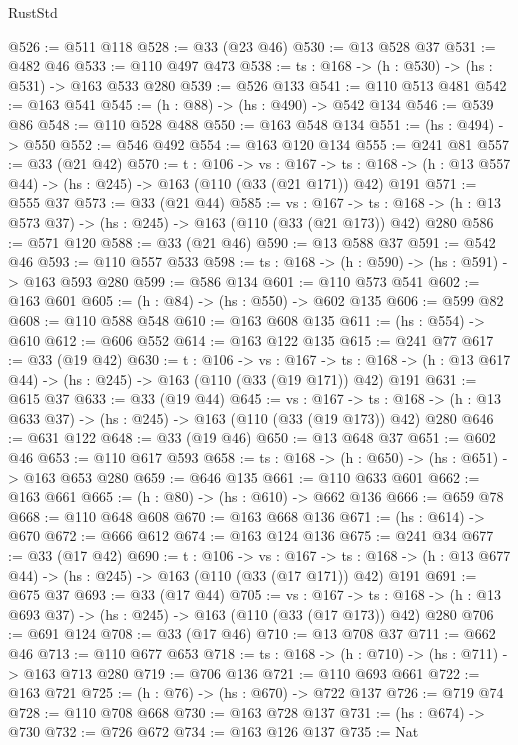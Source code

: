\begin{lexlean}{RustStd}
\begin{coremodule}
{\begin{coremodule}
{{{@526 := @511 @118
@528 := @33 (@23 @46)
@530 := @13 @528 @37
@531 := @482 @46
@533 := @110 @497 @473
@538 := {ts : @168} -> (h : @530) -> (hs : @531) -> @163 @533 @280
@539 := @526 @133
@541 := @110 @513 @481
@542 := @163 @541
@545 := (h : @88) -> (hs : @490) -> @542 @134
@546 := @539 @86
@548 := @110 @528 @488
@550 := @163 @548 @134
@551 := (hs : @494) -> @550
@552 := @546 @492
@554 := @163 @120 @134
@555 := @241 @81
@557 := @33 (@21 @42)
@570 := {t : @106} ->
  {vs : @167} ->
  {ts : @168} -> (h : @13 @557 @44) -> (hs : @245) -> @163 (@110 (@33 (@21 @171)) @42) @191
@571 := @555 @37
@573 := @33 (@21 @44)
@585 := {vs : @167} ->
  {ts : @168} -> (h : @13 @573 @37) -> (hs : @245) -> @163 (@110 (@33 (@21 @173)) @42) @280
@586 := @571 @120
@588 := @33 (@21 @46)
@590 := @13 @588 @37
@591 := @542 @46
@593 := @110 @557 @533
@598 := {ts : @168} -> (h : @590) -> (hs : @591) -> @163 @593 @280
@599 := @586 @134
@601 := @110 @573 @541
@602 := @163 @601
@605 := (h : @84) -> (hs : @550) -> @602 @135
@606 := @599 @82
@608 := @110 @588 @548
@610 := @163 @608 @135
@611 := (hs : @554) -> @610
@612 := @606 @552
@614 := @163 @122 @135
@615 := @241 @77
@617 := @33 (@19 @42)
@630 := {t : @106} ->
  {vs : @167} ->
  {ts : @168} -> (h : @13 @617 @44) -> (hs : @245) -> @163 (@110 (@33 (@19 @171)) @42) @191
@631 := @615 @37
@633 := @33 (@19 @44)
@645 := {vs : @167} ->
  {ts : @168} -> (h : @13 @633 @37) -> (hs : @245) -> @163 (@110 (@33 (@19 @173)) @42) @280
@646 := @631 @122
@648 := @33 (@19 @46)
@650 := @13 @648 @37
@651 := @602 @46
@653 := @110 @617 @593
@658 := {ts : @168} -> (h : @650) -> (hs : @651) -> @163 @653 @280
@659 := @646 @135
@661 := @110 @633 @601
@662 := @163 @661
@665 := (h : @80) -> (hs : @610) -> @662 @136
@666 := @659 @78
@668 := @110 @648 @608
@670 := @163 @668 @136
@671 := (hs : @614) -> @670
@672 := @666 @612
@674 := @163 @124 @136
@675 := @241 @34
@677 := @33 (@17 @42)
@690 := {t : @106} ->
  {vs : @167} ->
  {ts : @168} -> (h : @13 @677 @44) -> (hs : @245) -> @163 (@110 (@33 (@17 @171)) @42) @191
@691 := @675 @37
@693 := @33 (@17 @44)
@705 := {vs : @167} ->
  {ts : @168} -> (h : @13 @693 @37) -> (hs : @245) -> @163 (@110 (@33 (@17 @173)) @42) @280
@706 := @691 @124
@708 := @33 (@17 @46)
@710 := @13 @708 @37
@711 := @662 @46
@713 := @110 @677 @653
@718 := {ts : @168} -> (h : @710) -> (hs : @711) -> @163 @713 @280
@719 := @706 @136
@721 := @110 @693 @661
@722 := @163 @721
@725 := (h : @76) -> (hs : @670) -> @722 @137
@726 := @719 @74
@728 := @110 @708 @668
@730 := @163 @728 @137
@731 := (hs : @674) -> @730
@732 := @726 @672
@734 := @163 @126 @137
@735 := Nat
}}}
\end{coremodule}}
\end{coremodule}
\end{lexlean}
